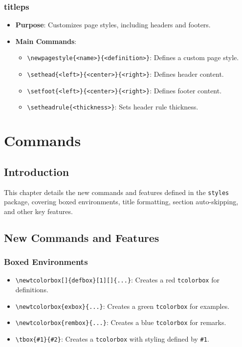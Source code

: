 \documentclass[12pt,twoside]{report}
\begin{document}
\subsection{titleps}
\begin{itemize}
    \item \textbf{Purpose}: Customizes page styles, including headers and footers.
    \item \textbf{Main Commands}:
    \begin{itemize}
        \item \verb|\newpagestyle{<name>}{<definition>}|: Defines a custom page style.
        \item \verb|\sethead{<left>}{<center>}{<right>}|: Defines header content.
        \item \verb|\setfoot{<left>}{<center>}{<right>}|: Defines footer content.
        \item \verb|\setheadrule{<thickness>}|: Sets header rule thickness.
    \end{itemize}
\end{itemize}

\chapter{Commands}

\section*{Introduction}
This chapter details the new commands and features defined in the \texttt{styles} package, covering boxed environments, title formatting, section auto-skipping, and other key features.

\section{New Commands and Features}

\subsection{Boxed Environments}
\begin{itemize}
    \item \verb|\newtcolorbox[]{defbox}[1][]{...}|: Creates a red \texttt{tcolorbox} for definitions.
    \item \verb|\newtcolorbox{exbox}{...}|: Creates a green \texttt{tcolorbox} for examples.
    \item \verb|\newtcolorbox{rembox}{...}|: Creates a blue \texttt{tcolorbox} for remarks.
    \item \verb|\tbox{#1}{#2}|: Creates a \texttt{tcolorbox} with styling defined by \verb|#1|.
\end{itemize}
\end{document}
